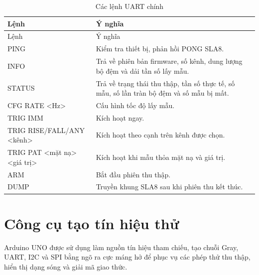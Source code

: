 \begin{longtable}[]{@{}|
  >{\raggedright\arraybackslash}p{}
  |>{\raggedright\arraybackslash}p{}|@{}}
\caption{Các lệnh UART chính}\tabularnewline
\hline
\begin{minipage}[b]{\linewidth}\raggedright
Lệnh
\end{minipage} & \begin{minipage}[b]{\linewidth}\raggedright
Ý nghĩa
\end{minipage} \\ \hline

\endfirsthead
\hline
\begin{minipage}[b]{\linewidth}\raggedright
Lệnh
\end{minipage} & \begin{minipage}[b]{\linewidth}\raggedright
Ý nghĩa
\end{minipage} \\ \hline

\endhead

\endlastfoot
PING & Kiểm tra thiết bị, phản hồi PONG SLA8. \\ \hline
INFO & Trả về phiên bản firmware, số kênh, dung lượng bộ đệm và dải tần số lấy mẫu. \\ \hline
STATUS & Trả về trạng thái thu thập, tần số thực tế, số mẫu, số lần tràn bộ đệm và số mẫu bị mất. \\ \hline
CFG RATE \textless Hz\textgreater{} & Cấu hình tốc độ lấy mẫu. \\ \hline
TRIG IMM & Kích hoạt ngay. \\ \hline
TRIG RISE/FALL/ANY \textless kênh\textgreater{} & Kích hoạt theo cạnh trên kênh được chọn. \\ \hline
TRIG PAT \textless mặt nạ\textgreater{} \textless giá trị\textgreater{} & Kích hoạt khi mẫu thỏa mặt nạ và giá trị. \\ \hline
ARM & Bắt đầu phiên thu thập. \\ \hline
DUMP & Truyền khung SLA8 sau khi phiên thu kết thúc. \\ \hline
\end{longtable}

\section{Công cụ tạo tín hiệu thử}\label{cuxf4ng-cux1ee5-tux1ea1o-tuxedn-hiux1ec7u-thux1eed}

Arduino UNO được sử dụng làm nguồn tín hiệu tham chiếu, tạo chuỗi Gray, UART, I2C và SPI bằng ngõ ra cực máng hở để phục vụ các phép thử thu thập, hiển thị dạng sóng và giải mã giao thức.


